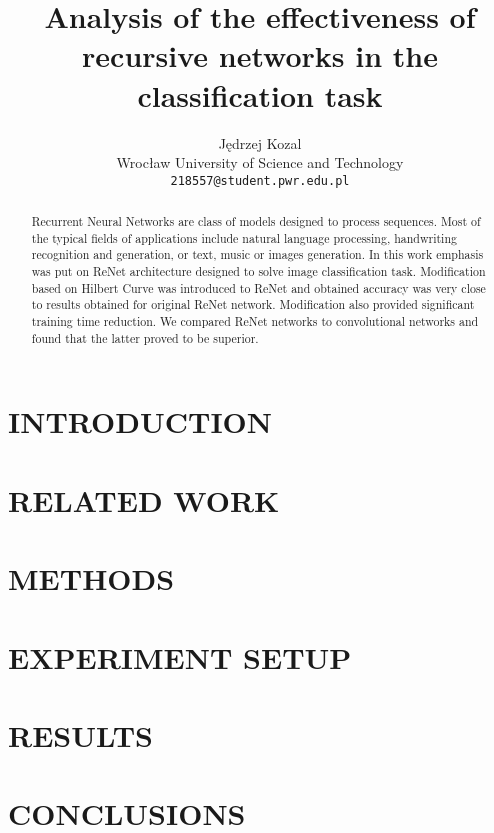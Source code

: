 \documentclass[a4paper, 10 pt, conference]{ieeeconf}
\title{\LARGE \bf
Analysis of the effectiveness of recursive
networks in the classification task
}
\author{\parbox{2 in}{\centering Jędrzej Kozal \\
        Wrocław University of Science and Technology\\
        {\tt\small 218557@student.pwr.edu.pl}}
}
\begin{document}
\maketitle
\thispagestyle{empty}
\pagestyle{empty}

\begin{abstract}

Recurrent Neural Networks are class of models designed to process sequences. Most of the typical fields of applications include natural language processing, handwriting recognition and generation, or text, music or images generation. In this work emphasis was put on ReNet architecture designed to solve image classification task. Modification based on Hilbert Curve was introduced to ReNet and obtained accuracy was very close to results obtained for original ReNet network. Modification also provided significant training time reduction. We compared ReNet networks to convolutional networks and found that the latter proved to be superior.

\end{abstract}


\section{INTRODUCTION}

\cite{Goodfellow-et-al-2016}

 

\section{RELATED WORK}

\section{METHODS}

\section{EXPERIMENT SETUP}

\section{RESULTS}

\section{CONCLUSIONS}





\end{document}
